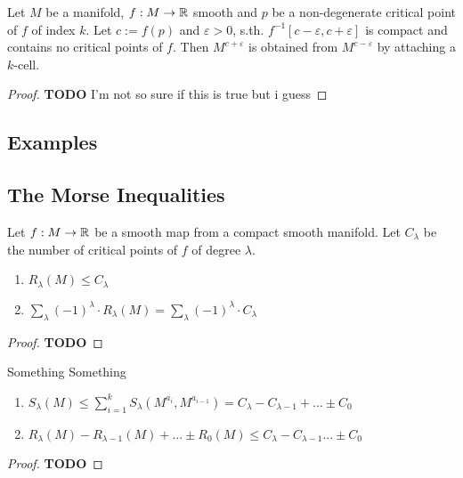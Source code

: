 \documentclass[a4paper,11pt]{article}
\begin{document}
\begin{theorem}
   \label{theorem:2nd deformation lemma}
   Let $M$ be a manifold, $f: M \rightarrow {\mathbb R}$ smooth and $p$ be a 
   non-degenerate critical point of $f$ of index $k$. Let $c := f(p)$ and 
   $\varepsilon > 0$, s.th. $f^{-1}[c-\varepsilon, c+\varepsilon]$ is compact and 
   contains no critical points of $f$. Then $M^{c+\varepsilon}$ is obtained from 
   $M^{c-\varepsilon}$ by attaching a $k$-cell.
\end{theorem}

\begin{proof}
   \textbf{TODO}
   I'm not so sure if this is true but i guess
\end{proof}

\subsection{Examples}

\subsection{The Morse Inequalities}

\begin{lemma}
   \label{lemma:weak morse inequalities}
   Let $f: M \rightarrow {\mathbb R}$ be a smooth map from a compact smooth manifold. Let 
   $C_{\lambda}$ be the number of critical points of $f$ of degree $\lambda$.
   \begin{enumerate}
      \item $R_{\lambda} (M) \leq C_{\lambda}$
      \item $\sum_{\lambda} (-1)^{\lambda} \cdot R_{\lambda}(M) = 
         \sum_{\lambda} (-1)^{\lambda} \cdot C_{\lambda} $
   \end{enumerate}
\end{lemma}

\begin{proof}
   \textbf{TODO}
\end{proof}

\begin{lemma}
   \label{lemma:strung morse inequalities}
   Something Something
   \begin{enumerate}
      \item $ S_{\lambda}(M) \leq \sum_{i = 1}^k S_{\lambda}(M^{a_i}, M^{a_{i-1}}) 
         = C_{\lambda} - C_{\lambda - 1} + ... \pm C_0 $
      \item $ R_{\lambda}(M) - R_{\lambda - 1}(M) + ... \pm R_0(M) \leq C_{\lambda} - C_{\lambda - 1} ... \pm C_0 $
   \end{enumerate}
\end{lemma}

\begin{proof}
   \textbf{TODO}
\end{proof}

\end{document}
